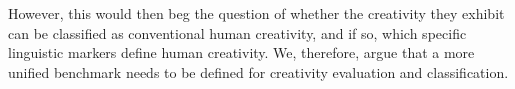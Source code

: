 \documentclass[a4paper,12pt]{article}
\begin{document}
However, this would then beg the question of whether the creativity they exhibit can be classified as conventional human creativity, and if so, which specific linguistic markers define human creativity. We, therefore, argue that a more unified benchmark needs to be defined for creativity evaluation and classification. 




\end{document}
